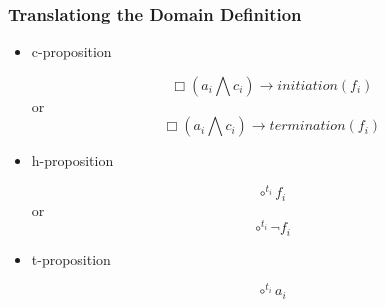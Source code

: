 \subsubsection{Translationg the Domain Definition}

\begin{itemize}
  \item c-proposition

  $$\Box(a_i\bigwedge c_i)\rightarrow initiation(f_i)$$ or $$\Box(a_i\bigwedge c_i)\rightarrow termination(f_i)$$
  \item h-proposition

  $$\circ^{t_i}f_i$$ or $$\circ^{t_i} \neg f_i$$
  \item t-proposition

  $$\circ^{t_i}a_i$$
\end{itemize}

\iffalse

\subsection{Naive approach from iterative}

To make the translation, we need to start from a domain langage for wich $\Pi$ is a discrete set of timepoint, and $\preceq$ is a total ordering of $\Pi$. On top of that, $\Pi$ need a timepoint $T_0$ such as $\forall T_i \in \Pi, T_0\preceq T_i$.

\subsubsection{Propositions}

\begin{itemize}
  \item c-proposition

  $$\Box(A_i\bigwedge C_i)\rightarrow \circ F_i$$ or $$\Box(A_i\bigwedge C_i)\rightarrow \circ \neg F_i$$
  \item h-proposition

  $$\circ^{T_i}F_i$$ or $$\circ^{T_i} \neg F_i$$
  \item t-proposition

  $$\circ^{T_i}A_i$$
\end{itemize}

\fi
